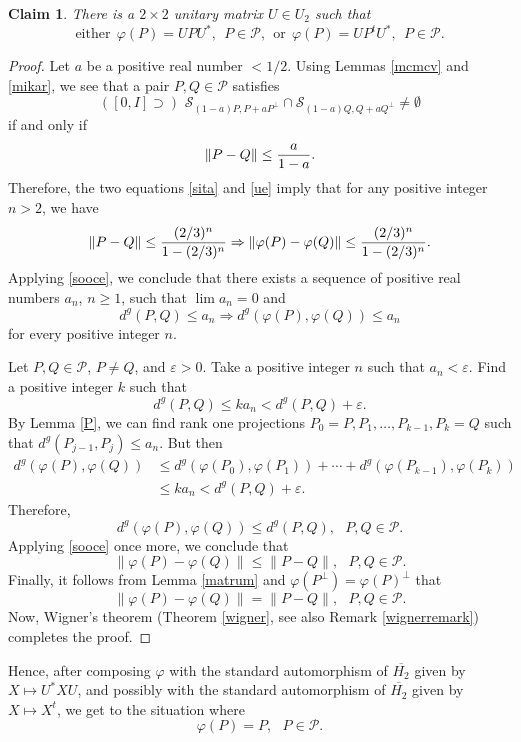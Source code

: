 \documentclass[10pt,a4paper]{amsart}
\newcommand\oH{{\overline{H_2}}}
\newtheorem{claim}[theorem]{Claim}
\theoremstyle{definition}
\theoremstyle{remark}
\numberwithin{subsection}{section}
\numberwithin{equation}{section}
\begin{document}
\begin{claim}
There is a $2\times 2$ unitary matrix $U\in U_2$ such that 
\[
\text{either}\ \ \varphi (P) = UPU^\ast,\ \  P \in \mathcal{P},\ \ \text{or}\ \  \varphi (P) = UP^tU^\ast,\ \ P \in \mathcal{P}.
\]
\end{claim}
\begin{proof}
Let $a$ be a positive real number $< 1/2$. Using Lemmas \ref{mcmcv} and \ref{mikar}, we see that a pair $P,Q \in \mathcal{P}$ satisfies
\[
([0,I]\supset) \,\, \mathcal{S}_{(1-a)P, P + aP^\perp} \cap \mathcal{S}_{(1-a)Q, Q + aQ^\perp} \not= \emptyset
\]
if and only if
\[
\| P - Q \| \le { a \over 1-a } .
\]
Therefore, the two equations \eqref{sita} and \eqref{ue} imply that for any positive integer $n > 2$, we have
\[
\| P -Q \| \le { (2/3)^n \over 1 - (2/3)^n } \Rightarrow \| \varphi (P ) - \varphi (Q) \| \le { (2/3)^n \over 1 - (2/3)^n }.
\]
Applying \eqref{sooce}, we conclude that there exists a sequence of positive real numbers $a_n$, $n\geq 1$, such that $\lim a_n = 0$ and
\[
d^g (P,Q) \le a_n \Rightarrow d^g (\varphi (P) , \varphi (Q)) \le a_n
\]
for every positive integer $n$.



Let $P,Q \in \mathcal{P}$, $P \not= Q$, and $ \varepsilon >0 $. Take a positive integer $n$ such that $a_n <  \varepsilon$. Find a positive integer $k$ such that
\[
d^g (P,Q) \le k a_n < d^g (P,Q) + \varepsilon.
\]
By Lemma \ref{P}, we can find rank one projections $P_0 = P, P_1 , \ldots, P_{k-1}, P_k = Q$ such that $d^g (P_{j-1},P_j) \le a_n$. But then
\[
\begin{split}
d^g (\varphi (P),\varphi (Q)) 
&\le d^g (\varphi (P_0),\varphi (P_1)) + \cdots +  d^g (\varphi (P_{k-1}),\varphi (P_k)) \\
& \leq  k a_n < d^g (P,Q) + \varepsilon.
\end{split}
\]
Therefore,
\[
d^g (\varphi (P),\varphi (Q)) \le d^g (P,Q), \ \ \ P,Q \in \mathcal{P}.
\]
Applying \eqref{sooce} once more, we conclude that
\[
\| \varphi (P) - \varphi (Q) \| \le \| P - Q \|, \ \ \ P,Q \in \mathcal{P}.
\]
Finally, it follows from Lemma \ref{matrum} and $\varphi (P^\perp) = \varphi(P)^\perp$ that 
\[
\| \varphi (P) - \varphi (Q) \| = \| P - Q \|, \ \ \ P,Q \in \mathcal{P}.
\]
Now, Wigner's theorem (Theorem \ref{wigner}, see also Remark \ref{wignerremark}) completes the proof. 
\end{proof}

Hence, after composing $\varphi$ with the standard automorphism of $\oH$ given by $X \mapsto U^\ast X U$, 
and possibly with the standard automorphism of $\oH$ given by $X \mapsto X^t$, we get to the situation where
\[
\varphi (P) = P, \ \ \ P \in \mathcal{P}.
\]
\end{document}
